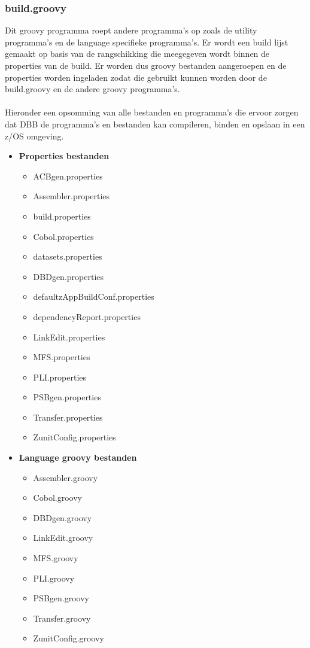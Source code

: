 \subsubsection{build.groovy}
Dit groovy programma roept andere programma's op zoals de utility programma's en de language specifieke programma's. Er wordt een build lijst gemaakt op basis van de rangschikking die meegegeven wordt binnen de properties van de build. Er worden dus groovy bestanden aangeroepen en de properties worden ingeladen zodat die gebruikt kunnen worden door de build.groovy en de andere groovy programma's. 
\\ \\
Hieronder een opsomming van alle bestanden en programma's die ervoor zorgen dat DBB de programma's en bestanden kan compileren, binden en opslaan in een z/OS omgeving.
\begin{multicols}{2}
    \begin{itemize}
        \item \textbf{Properties bestanden}
        \begin{itemize}
            \item ACBgen.properties
            \item Assembler.properties
            \item build.properties
            \item Cobol.properties
            \item datasets.properties
            \item DBDgen.properties
            \item defaultzAppBuildConf.properties
            \item dependencyReport.properties
            \item LinkEdit.properties
            \item MFS.properties
            \item PLI.properties
            \item PSBgen.properties
            \item Transfer.properties
            \item ZunitConfig.properties
        \end{itemize}
        
        \item \textbf{Language groovy bestanden}
        \begin{itemize}
            \item Assembler.groovy
            \item Cobol.groovy
            \item DBDgen.groovy
            \item LinkEdit.groovy
            \item MFS.groovy
            \item PLI.groovy
            \item PSBgen.groovy
            \item Transfer.groovy
            \item ZunitConfig.groovy
        \end{itemize}
        

\end{itemize}
\end{multicols}
